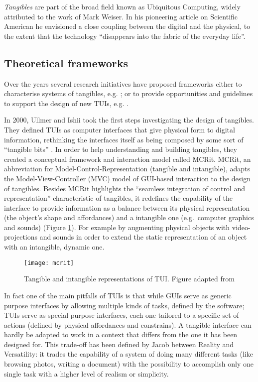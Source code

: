 \emph{Tangibles} are part of the broad field known as Ubiquitous Computing, widely attributed to the work of Mark Weiser. In his pioneering article on Scientific American \autocite{weiser1991computer} he envisioned a close coupling between the digital and the physical, to the extent that the technology ``disappears into the fabric of the everyday life''.

\subsection{Theoretical frameworks}\label{frameworks}

Over the years several research initiatives have proposed frameworks either to characterise systems of tangibles, e.g. \autocites{Fishkin:2004uv}{Jacob:2008vm}{Hornecker:2006uq}; or to provide opportunities and guidelines to support the design of new TUIs, e.g. \autocites{Benford:2005bo}{Shaer:2004ta}{Rogers:2006te}.

In 2000, Ullmer and Ishii \autocite*{Ullmer:2000vf} took the first steps investigating the design of tangibles. They defined TUIs as computer interfaces that give physical form to digital information, rethinking the interfaces itself as being composed by some sort of ``tangible bits'' \autocite{Ishii:2008fh}. In order to help understanding and building tangibles, they created a conceptual framework and interaction model called MCRit. MCRit, an abbreviation for Model-Control-Representation (tangible and intangible), adapts the Model-View-Controller (MVC) model of GUI-based interaction to the design of tangibles. Besides MCRit highlights the ``seamless integration of control and representation'' characteristic of tangibles, it redefines the capability of the interface to provide information as a balance between its physical representation (the object's shape and affordances) and a intangible one (e.g.~computer graphics and sounds) (Figure \ref{fig:mcrit-model}). For example by augmenting physical objects with video-projections and sounds in order to extend the static representation of an object with an intangible, dynamic one.

\begin{figure}
	[tbh] \centering 
	\texttt{[image: mcrit]} \caption{Tangible and intangible representations of TUI. Figure adapted from \protect\autocite{Ishii:2008fh}} \label{fig:mcrit-model} 
\end{figure}

In fact one of the main pitfalls of TUIs is that while GUIs serve as generic purpose interfaces by allowing multiple kinds of tasks, defined by the software; TUIs serve as special purpose interfaces, each one tailored to a specific set of actions (defined by physical affordances and constrains). A tangible interface can hardly be adapted to work in a context that differs from the one it has been designed for. This trade-off has been defined by Jacob \autocite*{Jacob:2008vm} between Reality and Versatility: it trades the capability of a system of doing many different tasks (like browsing photos, writing a document) with the possibility to accomplish only one single task with a higher level of realism or simplicity.

